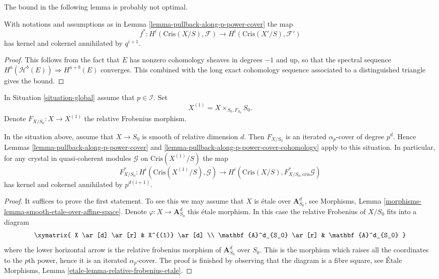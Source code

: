 \noindent
The bound in the following lemma is probably not optimal.

\begin{lemma}
\label{lemma-pullback-along-p-power-cover-cohomology}
With notations and assumptions as in
Lemma \ref{lemma-pullback-along-p-power-cover}
the map
$$
f^* :
H^i(\text{Cris}(X/S), \mathcal{F})
\longrightarrow
H^i(\text{Cris}(X'/S), \mathcal{F}')
$$
has kernel and cokernel annihilated by $q^{i + 1}$.
\end{lemma}

\begin{proof}
This follows from the fact that $E$ has nonzero cohomology sheaves in
degrees $-1$ and up, so that the spectral sequence
$H^a(\mathcal{H}^b(E)) \Rightarrow H^{a + b}(E)$ converges.
This combined with the long exact cohomology sequence associated
to a distinguished triangle gives the bound.
\end{proof}

\noindent
In Situation \ref{situation-global} assume that $p \in \mathcal{I}$.
Set
$$
X^{(1)} = X \times_{S_0, F_{S_0}} S_0.
$$
Denote $F_{X/S_0} : X \to X^{(1)}$ the relative Frobenius morphism.

\begin{lemma}
\label{lemma-pullback-relative-frobenius}
In the situation above, assume that $X \to S_0$ is smooth of relative
dimension $d$. Then $F_{X/S_0}$ is an iterated $\alpha_p$-cover
of degree $p^d$. Hence Lemmas \ref{lemma-pullback-along-p-power-cover} and
\ref{lemma-pullback-along-p-power-cover-cohomology} apply to this
situation. In particular, for any crystal in quasi-coherent modules
$\mathcal{G}$ on $\text{Cris}(X^{(1)}/S)$ the map
$$
F_{X/S_0}^* : H^i(\text{Cris}(X^{(1)}/S), \mathcal{G})
\longrightarrow
H^i(\text{Cris}(X/S), F_{X/S_0, \text{cris}}^*\mathcal{G})
$$
has kernel and cokernel annihilated by $p^{d(i + 1)}$.
\end{lemma}

\begin{proof}
It suffices to prove the first statement. To see this we may assume
that $X$ is \'etale over $\mathbf{A}^d_{S_0}$, see
Morphisms, Lemma \ref{morphisms-lemma-smooth-etale-over-affine-space}.
Denote $\varphi : X \to \mathbf{A}^d_{S_0}$ this \'etale morphism.
In this case the relative Frobenius of $X/S_0$ fits into a diagram
$$
\xymatrix{
X \ar[d] \ar[r] & X^{(1)} \ar[d] \\
\mathbf{A}^d_{S_0} \ar[r] & \mathbf{A}^d_{S_0}
}
$$
where the lower horizontal arrow is the relative frobenius morphism
of $\mathbf{A}^d_{S_0}$ over $S_0$. This is the morphism which raises
all the coordinates to the $p$th power, hence it is an iterated
$\alpha_p$-cover. The proof is finished by observing that the diagram
is a fibre square, see
\'Etale Morphisms, Lemma \ref{etale-lemma-relative-frobenius-etale}.
\end{proof}













